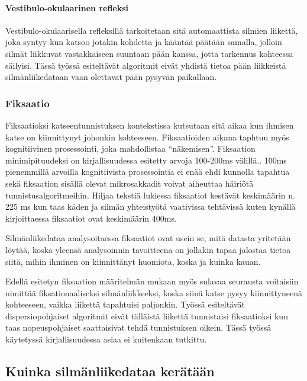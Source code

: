 \paragraph{Vestibulo-okulaarinen refleksi}
Vestibulo-okulaarisella refleksillä tarkoitetaan sitä automaattista silmien liikettä, joka syntyy kun katsoo jotakin kohdetta ja kääntää päätään samalla, jolloin silmät liikkuvat vastakkaiseen suuntaan pään kanssa, jotta tarkennus kohteessa säilyisi.\citep[s.210]{laurutis1986vestibulo} Tässä työssä esiteltävät algoritmit eivät yhdistä tietoa pään liikkeistä silmänliikedataan vaan olettavat pään pysyvän paikallaan.

\subsubsection{Fiksaatio}
Fiksaatioksi katseentunnistuksen kontekstissa kutsutaan sitä aikaa kun ihmisen katse on kiinnittynyt johonkin kohteeseen.\citep[s. 71]{salvucci2000} Fiksaatioiden aikana taphtuu myös kognitiivinen prosessointi, joka mahdollistaa ``näkemisen''.\citep[s. 881]{Blignaut2009} Fiksaation minimipituudeksi on kirjallisuudessa esitetty arvoja 100-200ms välillä.\citep[s. 85]{manor2003}\citep[s. 881]{Blignaut2009}. 100ms pienemmillä arvoilla kognitiivista prosessointia ei enää ehdi kunnolla tapahtua sekä fiksaation sisällä olevat mikrosakkadit voivat aiheuttaa häiriötä tunnistusalgoritmeihin. Hiljaa tekstiä lukiessa fiksaatiot kestävät keskimäärin n. 225 ms kun taas käden ja silmän yhteistyötä vaativissa tehtävissä kuten kynällä kirjoittaessa fiksaatiot ovat keskimäärin 400ms.\citep[s.373]{rayner1998eye}

Silmänliikedataa analysoitaessa fiksaatiot ovat usein se, mitä datasta yritetään löytää, koska yleensä analysoinnin tavoitteena on jollakin tapaa jalostaa tietoa siitä, mihin ihminen on kiinnittänyt huomiota, koska ja kuinka kauan. 

Edellä esitetyn fiksaation määritelmän mukaan myös sulavaa seurausta voitaisiin nimittää fiksationaaliseksi silmänliikkeeksi, koska siinä katse pysyy kiinnittyneenä kohteeseen, vaikka liikettä tapahtuisi paljonkin. Työssä esiteltävät dispersiopohjaiset algoritmit eivät tälläistä liikettä tunnistaisi fiksaatioksi kun taas nopeuspohjaiset saattaisivat tehdä tunnistuksen oikein. Tässä työssä käytetyssä kirjallisuudessa asiaa ei kuitenkaan tutkittu.

\subsection{Kuinka silmänliikedataa kerätään}

